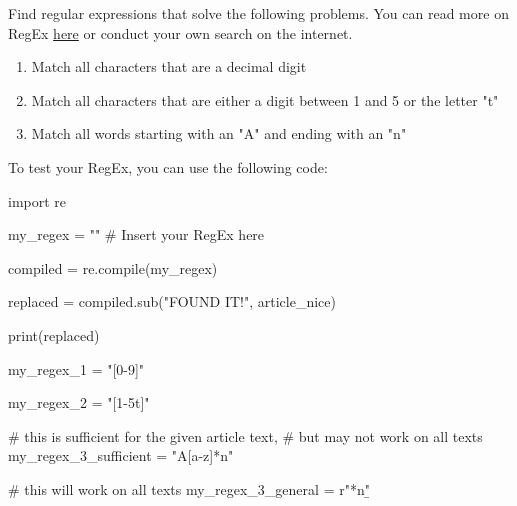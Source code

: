\noindent Find regular expressions that solve the following problems. You can read more on RegEx \href{https://docs.python.org/3/howto/regex.html}{here} or conduct your own search on the internet. 

\begin{enumerate}

\item Match all characters that are a decimal digit
\item Match all characters that are either a digit between 1 and 5 or the letter "t"
\item Match all words starting with an "A" and ending with an "n"

\end{enumerate}

\vspace{1em}

\noindent To test your RegEx, you can use the following code:

\begin{pythoncode}

import re

my_regex = "" # Insert your RegEx here

compiled = re.compile(my_regex)

replaced = compiled.sub("FOUND IT!", article_nice)

print(replaced)


\end{pythoncode}

\vspace{1em}

\begin{solution}

    \begin{pythoncode}

my_regex_1 = "[0-9]"

my_regex_2 = "[1-5t]"

# this is sufficient for the given article text,
# but may not work on all texts
my_regex_3_sufficient = "A[a-z]*n\s"

# this will work on all texts
my_regex_3_general = r"\bA[a-z]*n\b"
    
    \end{pythoncode}

\end{solution}


